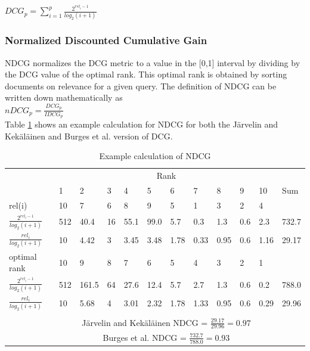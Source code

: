 $DCG_p = \sum\nolimits_{i=1}^p \frac{2^{rel_i-1}}{log_2(i+1)}$\\

\subsubsection{Normalized Discounted Cumulative Gain}
\ac{NDCG} normalizes the \ac{DCG} metric to a value in the [0,1] interval by dividing by the \ac{DCG} value of the optimal rank. This optimal rank is obtained by sorting documents on relevance for a given query. The definition of \ac{NDCG} can be written down mathematically as\\

$nDCG_p = \frac{DCG_p}{IDCG_p}$\\

Table \ref{tab:example_calculation_NDCG} shows an example calculation for \ac{NDCG} for both the J{\"a}rvelin and Kek{\"a}l{\"a}inen \cite{Jarvelin2002} and Burges et al. \cite{Burges2005} version of \ac{DCG}.\\

\begin{table}[!h]
\begin{tabular}{llllllllllll}
 & \multicolumn{10}{c}{Rank} &  \\ 
\cline{2-11}
 & 1 & 2 & 3 & 4 & 5 & 6 & 7 & 8 & 9 & 10 & Sum \\ 
\hline
\hline
rel(i) & 10 & 7 & 6 & 8 & 9 & 5 & 1 & 3 & 2 & 4 &  \\
\hline
$\frac{2^{rel_i-1}}{log_2(i+1)}$ & 512 & 40.4 & 16 & 55.1 & 99.0 & 5.7 & 0.3 & 1.3 & 0.6 & 2.3 & 732.7 \\
\hline
$\frac{rel_i}{log_2(i+1)}$ & 10 & 4.42 & 3 & 3.45 & 3.48 & 1.78 & 0.33 & 0.95 & 0.6 & 1.16 & 29.17 \\  
\hline
\hline
optimal rank & 10 & 9 & 8 & 7 & 6 & 5 & 4 & 3 & 2 & 1 &  \\
\hline 
$\frac{2^{rel_i-1}}{log_2(i+1)}$ & 512 & 161.5 & 64 & 27.6 & 12.4 & 5.7 & 2.7 & 1.3 & 0.6 & 0.2 & 788.0 \\
\hline
$\frac{rel_i}{log_2(i+1)}$ & 10 & 5.68 & 4 & 3.01 & 2.32 & 1.78 & 1.33 & 0.95 & 0.6 & 0.29 & 29.96 \\   
\hline
 &  &  &  &  &  &  &  &  &  &  &  \\
 & \multicolumn{10}{c}{J{\"a}rvelin and Kek{\"a}l{\"a}inen \cite{Jarvelin2002} \ac{NDCG} = $\frac{29.17}{29.96} = 0.97$} &  \\  
 & \multicolumn{10}{c}{Burges \cite{Burges2005} et al. \ac{NDCG} = $\frac{732.7}{788.0} = 0.93$} &  \\ 
\end{tabular}
\caption{Example calculation of \acs{NDCG}}
\label{tab:example_calculation_NDCG}
\end{table}

